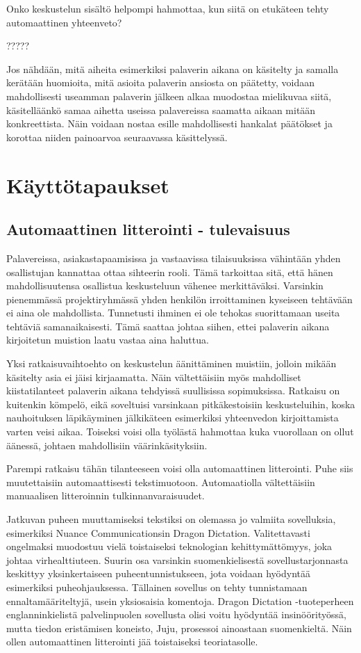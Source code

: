 \documentclass[11pt,a4paper,oneside]{memoir}
\begin{document}
Onko keskustelun sisältö helpompi hahmottaa, kun siitä on etukäteen tehty automaattinen yhteenveto?

?????

Jos nähdään, mitä aiheita esimerkiksi palaverin aikana on käsitelty ja samalla kerätään huomioita, mitä asioita palaverin ansiosta on päätetty, voidaan mahdollisesti useamman palaverin jälkeen alkaa muodostaa mielikuvaa siitä, käsitelläänkö samaa aihetta useissa palavereissa saamatta aikaan mitään konkreettista. Näin voidaan nostaa esille mahdollisesti hankalat päätökset ja korottaa niiden painoarvoa seuraavassa käsittelyssä.

\chapter{Käyttötapaukset}

\section{Automaattinen litterointi - tulevaisuus}
Palavereissa, asiakastapaamisissa ja vastaavissa tilaisuuksissa vähintään yhden osallistujan kannattaa ottaa sihteerin rooli. Tämä tarkoittaa sitä, että hänen mahdollisuutensa osallistua keskusteluun vähenee merkittäväksi. Varsinkin pienemmässä projektiryhmässä yhden henkilön irroittaminen kyseiseen tehtävään ei aina ole mahdollista. Tunnetusti ihminen ei ole tehokas suorittamaan useita tehtäviä samanaikaisesti. Tämä saattaa johtaa siihen, ettei palaverin aikana kirjoitetun muistion laatu vastaa aina haluttua.

Yksi ratkaisuvaihtoehto on keskustelun äänittäminen muistiin, jolloin mikään käsitelty asia ei jäisi kirjaamatta. Näin vältettäisiin myös mahdolliset kiistatilanteet palaverin aikana tehdyissä suullisissa sopimuksissa. Ratkaisu on kuitenkin kömpelö, eikä soveltuisi varsinkaan pitkäkestoisiin keskusteluihin, koska nauhoituksen läpikäyminen jälkikäteen esimerkiksi yhteenvedon kirjoittamista varten veisi aikaa. Toiseksi voisi olla työlästä hahmottaa kuka vuorollaan on ollut äänessä, johtaen mahdollisiin väärinkäsityksiin.

Parempi ratkaisu tähän tilanteeseen voisi olla automaattinen litterointi. Puhe siis muutettaisiin automaattisesti tekstimuotoon. Automaatiolla vältettäisiin manuaalisen litteroinnin tulkinnanvaraisuudet.

Jatkuvan puheen muuttamiseksi tekstiksi on olemassa jo valmiita sovelluksia, esimerkiksi Nuance Communicationsin Dragon Dictation. Valitettavasti ongelmaksi muodostuu vielä toistaiseksi teknologian kehittymättömyys, joka johtaa  virhealttiuteen. Suurin osa varsinkin suomenkielisestä sovellustarjonnasta keskittyy yksinkertaiseen puheentunnistukseen, jota voidaan hyödyntää esimerkiksi puheohjauksessa. Tällainen sovellus on tehty tunnistamaan ennaltamääriteltyjä, usein yksiosaisia komentoja. Dragon Dictation -tuoteperheen englanninkielistä palvelinpuolen sovellusta olisi voitu hyödyntää insinöörityössä, mutta tiedon eristämisen koneisto, Juju, prosessoi ainoastaan suomenkieltä. Näin ollen automaattinen litterointi jää toistaiseksi teoriatasolle.
\end{document}
